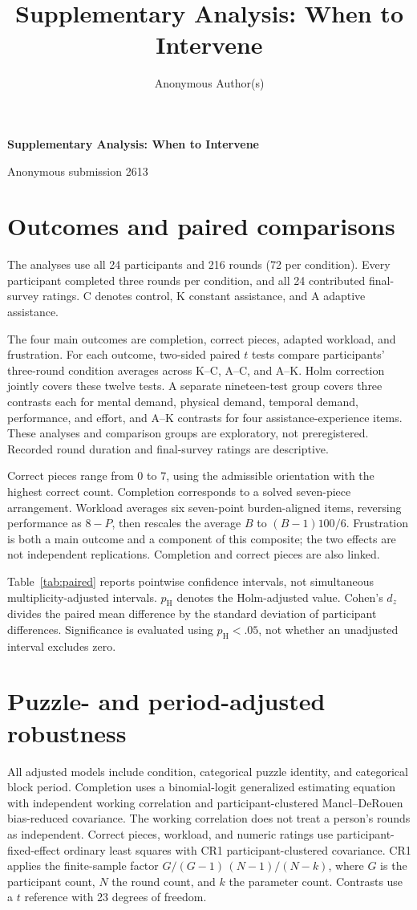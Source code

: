 \documentclass[sigconf,anonymous]{aamas}
\title{Supplementary Analysis: When to Intervene}
\author{Anonymous Author(s)}
\begin{document}
\onecolumn
\pagestyle{plain}
\begin{center}
{\fontsize{14}{16}\selectfont\bfseries Supplementary Analysis: When to Intervene}\par\medskip
Anonymous submission 2613
\end{center}
\section{Outcomes and paired comparisons}
The analyses use all 24 participants and 216 rounds (72 per condition). Every participant completed three rounds per condition, and all 24 contributed final-survey ratings. C denotes control, K constant assistance, and A adaptive assistance.

The four main outcomes are completion, correct pieces, adapted workload, and frustration. For each outcome, two-sided paired $t$ tests compare participants' three-round condition averages across K--C, A--C, and A--K. Holm correction jointly covers these twelve tests. A separate nineteen-test group covers three contrasts each for mental demand, physical demand, temporal demand, performance, and effort, and A--K contrasts for four assistance-experience items. These analyses and comparison groups are exploratory, not preregistered. Recorded round duration and final-survey ratings are descriptive.

Correct pieces range from 0 to 7, using the admissible orientation with the highest correct count. Completion corresponds to a solved seven-piece arrangement. Workload averages six seven-point burden-aligned items, reversing performance as $8-P$, then rescales the average $B$ to $(B-1)100/6$. Frustration is both a main outcome and a component of this composite; the two effects are not independent replications. Completion and correct pieces are also linked.

Table~\ref{tab:paired} reports pointwise confidence intervals, not simultaneous multiplicity-adjusted intervals. $p_{\mathrm{H}}$ denotes the Holm-adjusted value. Cohen's $d_z$ divides the paired mean difference by the standard deviation of participant differences. Significance is evaluated using $p_{\mathrm{H}}<.05$, not whether an unadjusted interval excludes zero.


\section{Puzzle- and period-adjusted robustness}
All adjusted models include condition, categorical puzzle identity, and categorical block period. Completion uses a binomial-logit generalized estimating equation with independent working correlation and participant-clustered Mancl--DeRouen bias-reduced covariance. The working correlation does not treat a person's rounds as independent. Correct pieces, workload, and numeric ratings use participant-fixed-effect ordinary least squares with CR1 participant-clustered covariance. CR1 applies the finite-sample factor $G/(G-1)\,(N-1)/(N-k)$, where $G$ is the participant count, $N$ the round count, and $k$ the parameter count. Contrasts use a $t$ reference with 23 degrees of freedom.
\end{document}
